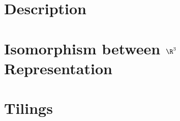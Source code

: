 \section{Description}
  \label{sec:adjrep-desc}
\section{Isomorphism between $\R^3$ Representation}
  \label{sec:adj->R3}    
\section{Tilings}
  \label{sec:tilings}    
